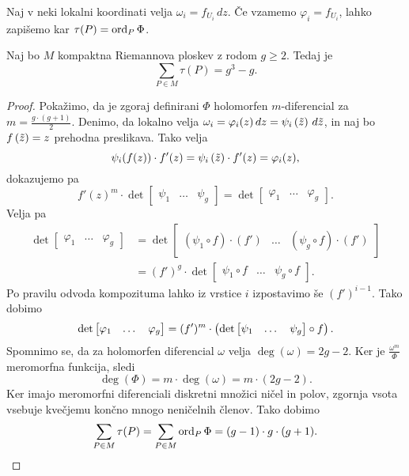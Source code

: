 Naj v neki lokalni koordinati velja $\omega_i = f_{U_i}\,dz$. Če
vzamemo $\varphi_i = f_{U_i}$, lahko zapišemo kar
$\tau(P) = \operatorname{ord}_P \Phi$.

\begin{trditev}
Naj bo $M$ kompaktna Riemannova ploskev z rodom $g \geq 2$. Tedaj
je
\[
\sum_{P \in M} \tau(P) = g^3-g.
\]
\end{trditev}

\begin{proof}
Pokažimo, da je zgoraj definirani $\Phi$ holomorfen $m$-diferencial
za $m = \frac{g \cdot (g+1)}{2}$. Denimo, da lokalno velja
$\omega_i = \varphi_i(z)\,dz = \psi_i \left(\tilde{z}\right)\,d\tilde{z}$,
in naj bo $f \left(\tilde{z}\right) = z$ prehodna preslikava. Tako velja
\[
\psi_i(f(z)) \cdot f'(z) =
\psi_i \left(\tilde{z}\right) \cdot f'(z) =
\varphi_i(z),
\]
dokazujemo pa
\[
f'(z)^m \cdot \det
\begin{bmatrix}
\psi_1 & \dots & \psi_g
\end{bmatrix}
=
\det
\begin{bmatrix}
\varphi_1 & \dots & \varphi_g
\end{bmatrix}.
\]
Velja pa
\begin{align*}
\det
\begin{bmatrix}
\varphi_1 & \dots & \varphi_g
\end{bmatrix}
&=
\det
\begin{bmatrix}
(\psi_1 \circ f) \cdot (f') & \dots & (\psi_g \circ f) \cdot (f')
\end{bmatrix}
\\
&=
(f')^g \cdot \det
\begin{bmatrix}
\psi_1 \circ f & \dots & \psi_g \circ f
\end{bmatrix}.
\end{align*}
Po pravilu odvoda kompozituma lahko iz vrstice $i$ izpostavimo še
$(f')^{i-1}$. Tako dobimo
\[
\det
\begin{bmatrix}
\varphi_1 & \dots & \varphi_g
\end{bmatrix}
=
(f')^m \cdot \left(\det
\begin{bmatrix}
\psi_1 & \dots & \psi_g
\end{bmatrix}
\circ f\right).
\]
Spomnimo se, da za holomorfen diferencial $\omega$ velja
$\deg (\omega) = 2g - 2$. Ker je $\frac{\omega^m}{\Phi}$ meromorfna
funkcija, sledi
\[
\deg (\Phi) = m \cdot \deg (\omega) = m \cdot (2g - 2).
\]
Ker imajo meromorfni diferenciali diskretni množici ničel in polov,
zgornja vsota vsebuje kvečjemu končno mnogo neničelnih členov. Tako
dobimo
\[
\sum_{P \in M} \tau(P) =
\sum_{P \in M} \operatorname{ord}_P \Phi =
(g-1) \cdot g \cdot (g+1). \qedhere
\]
\end{proof}

